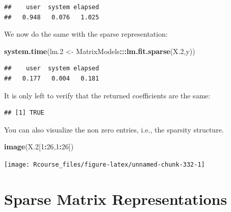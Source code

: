 \documentclass[]{book}
\newenvironment{Shaded}{\begin{snugshade}}{\end{snugshade}}
\newcommand{\DataTypeTok}[1]{\textcolor[rgb]{0.13,0.29,0.53}{#1}}
\newcommand{\DecValTok}[1]{\textcolor[rgb]{0.00,0.00,0.81}{#1}}
\newcommand{\FloatTok}[1]{\textcolor[rgb]{0.00,0.00,0.81}{#1}}
\newcommand{\KeywordTok}[1]{\textcolor[rgb]{0.13,0.29,0.53}{\textbf{#1}}}
\newcommand{\NormalTok}[1]{#1}
\newcommand{\OperatorTok}[1]{\textcolor[rgb]{0.81,0.36,0.00}{\textbf{#1}}}
\newcommand{\StringTok}[1]{\textcolor[rgb]{0.31,0.60,0.02}{#1}}
\theoremstyle{definition}
\theoremstyle{definition}
\theoremstyle{definition}
\theoremstyle{remark}
\begin{document}
\begin{verbatim}
##    user  system elapsed 
##   0.948   0.076   1.025
\end{verbatim}

We now do the same with the sparse representation:

\begin{Shaded}
\begin{Highlighting}[]
\KeywordTok{system.time}\NormalTok{(lm}\FloatTok{.2}\NormalTok{ <-}\StringTok{ }\NormalTok{MatrixModels}\OperatorTok{:::}\KeywordTok{lm.fit.sparse}\NormalTok{(X}\FloatTok{.2}\NormalTok{,y))}
\end{Highlighting}
\end{Shaded}

\begin{verbatim}
##    user  system elapsed 
##   0.177   0.004   0.181
\end{verbatim}

It is only left to verify that the returned coefficients are the same:

\begin{Shaded}
\end{Shaded}

\begin{verbatim}
## [1] TRUE
\end{verbatim}

You can also visualize the non zero entries, i.e., the sparsity structure.

\begin{Shaded}
\begin{Highlighting}[]
\KeywordTok{image}\NormalTok{(X}\FloatTok{.2}\NormalTok{[}\DecValTok{1}\OperatorTok{:}\DecValTok{26}\NormalTok{,}\DecValTok{1}\OperatorTok{:}\DecValTok{26}\NormalTok{])}
\end{Highlighting}
\end{Shaded}

\texttt{[image: Rcourse\_files/figure-latex/unnamed-chunk-332-1]}

\hypertarget{sparse-matrix-representations}{%
\section{Sparse Matrix Representations}\label{sparse-matrix-representations}}
\end{document}
